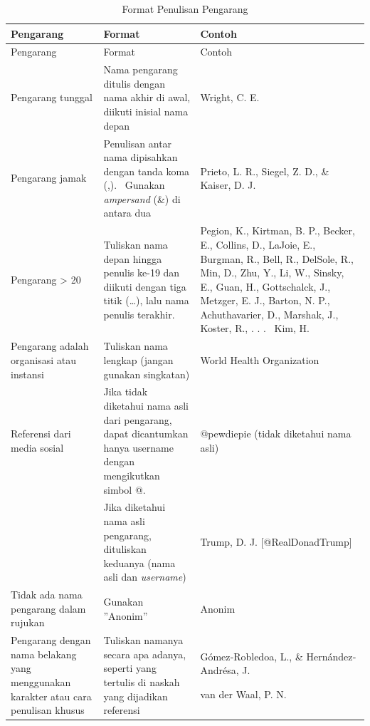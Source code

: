 \documentclass[
  indonesian,
  letterpaper,
]{scrbook}
\begin{document}
\begin{longtable}[]{@{}
  >{\raggedright\arraybackslash}p{}
  >{\raggedright\arraybackslash}p{}
  >{\raggedright\arraybackslash}p{}@{}}
\caption{Format Penulisan
Pengarang}\label{tbl-formatnamadafpus}\tabularnewline
\toprule\noalign{}
\begin{minipage}[b]{\linewidth}\raggedright
Pengarang
\end{minipage} & \begin{minipage}[b]{\linewidth}\raggedright
Format
\end{minipage} & \begin{minipage}[b]{\linewidth}\raggedright
Contoh
\end{minipage} \\
\midrule\noalign{}
\endfirsthead
\toprule\noalign{}
\begin{minipage}[b]{\linewidth}\raggedright
Pengarang
\end{minipage} & \begin{minipage}[b]{\linewidth}\raggedright
Format
\end{minipage} & \begin{minipage}[b]{\linewidth}\raggedright
Contoh
\end{minipage} \\
\midrule\noalign{}
\endhead
\bottomrule\noalign{}
\endlastfoot
Pengarang tunggal & Nama pengarang ditulis dengan nama akhir di awal,
diikuti inisial nama depan & Wright, C. E. \\
Pengarang jamak & Penulisan antar nama dipisahkan dengan tanda koma
(,).~ Gunakan \emph{ampersand} (\&) di antara dua & Prieto, L. R.,
Siegel, Z. D., \& Kaiser, D. J. \\
Pengarang \textgreater{} 20 & Tuliskan nama depan hingga penulis ke-19
dan diikuti dengan tiga titik (\ldots), lalu nama penulis terakhir. &
Pegion, K., Kirtman, B. P., Becker, E., Collins, D., LaJoie, E.,
Burgman, R., Bell, R., DelSole, R., Min, D., Zhu, Y., Li, W., Sinsky,
E., Guan, H., Gottschalck, J., Metzger, E. J., Barton, N. P.,
Achuthavarier, D., Marshak, J., Koster, R., . . . ~Kim, H. \\
Pengarang adalah organisasi atau instansi & Tuliskan nama lengkap
(jangan gunakan singkatan) & World Health Organization \\
Referensi dari media sosial & Jika tidak diketahui nama asli dari
pengarang, dapat dicantumkan hanya username dengan mengikutkan simbol @.
& @pewdiepie (tidak diketahui nama asli) \\
& Jika diketahui nama asli pengarang, dituliskan keduanya (nama asli dan
\emph{username}) & Trump, D. J. {[}@RealDonadTrump{]} \\
Tidak ada nama pengarang dalam rujukan & Gunakan ''Anonim'' & Anonim \\
Pengarang dengan nama belakang yang menggunakan karakter atau cara
penulisan khusus & Tuliskan namanya secara apa adanya, seperti yang
tertulis di naskah yang dijadikan referensi & Gómez‐Robledoa, L., \&
Hernández‐Andrésa, J.

van der Waal, P. N. \\
\end{longtable}
\end{document}
